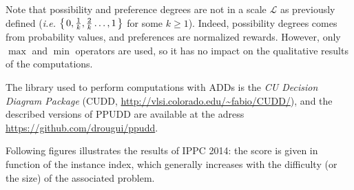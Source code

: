 Note that possibility and preference degrees are not in a scale $\mathcal{L}$ 
as previously defined (\textit{i.e.} $\left\{ \left.  0, \frac{1}{k}, \frac{2}{k} \ldots, 1  \right. \right\}$ for some $k \geqslant1$).
Indeed, possibility degrees comes from probability values, 
and preferences are normalized rewards.
However, only $\max$ and $\min$ operators are used, 
so it has no impact on the qualitative results of the computations. 

The library used to perform computations with ADDs
is the \textit{CU Decision Diagram Package} 
(CUDD, \url{http://vlsi.colorado.edu/~fabio/CUDD/}),
and the described versions of PPUDD are available 
at the adress \url{https://github.com/drougui/ppudd}.

Following figures illustrates the results of IPPC 2014:
the score is given in function of the instance index,
which generally increases with the difficulty (or the size) 
of the associated problem.

